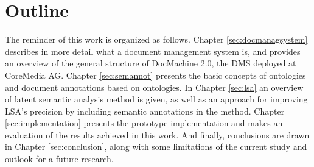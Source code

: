 \section{Outline}
\label{sec:introduction:outline}
The reminder of this work is organized as follows. Chapter \ref{sec:docmanagsystem} describes in more detail what a document management system is, and provides an overview of the general structure of DocMachine 2.0, the DMS deployed at CoreMedia AG. Chapter \ref{sec:semannot} presents the basic concepts of ontologies and document annotations based on ontologies. In Chapter \ref{sec:lsa} an overview of latent semantic analysis method is given, as well as an approach for improving LSA's precision by including semantic annotations in the method. Chapter \ref{sec:implementation} presents the prototype implementation and makes an evaluation of the results achieved in this work. And finally, conclusions are drawn in Chapter \ref{sec:conclusion}, along with some limitations of the current study and outlook for a future research.   \\ 
